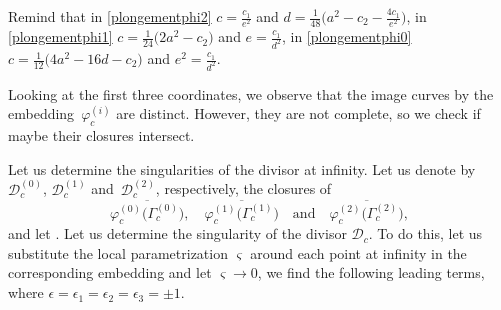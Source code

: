 \documentclass[pdftex]{sigma}
\numberwithin{equation}{section}
\begin{document}
Remind that in \eqref{plongementphi2} $c=\frac{c_1}{e^2}$ and $d=
\frac{1}{48} \bigl(a^2-c_2-\frac{4c_1}{e^2} \bigr)$, in
\eqref{plongementphi1} $c=\frac{1}{24} \bigl(2a^2-c_2 \bigr)$ and
$e=\frac{c_1}{d^2}$, in \eqref{plongementphi0}
$c=\frac{1}{12} \bigl(4a^2-16d-c_2\big )$ and
$e^2=\frac{c_1}{d^2}$.

Looking at the first three coordinates, we observe that the image
curves by the embedding~$\varphi_c^{ (i )}$ are distinct.
However, they are not complete, so we check if maybe their
closures intersect.

Let us determine the singularities of the divisor at infinity. Let
us denote by $\mathcal{D}_c^{ (0 )}$, $\mathcal{D}_c^{ (1 )}$ and~$\mathcal{D}_c^{(2)}$, respectively, the closures of
\[
\overline{\varphi_c^{ (0 )} \bigl(\Gamma_c^{ (0 )} \bigr)},  \quad \overline{\varphi_c^{ (1 )} \bigl(\Gamma_c^{ (1 )} \bigr)} \quad \text{and} \quad \overline{\varphi_c^{(2)} \bigl(\Gamma_c^{(2)} \bigr)},
 \]
and let . Let us determine the singularity of
the divisor $\mathcal{D}_c$. To do this, let us substitute the local
parametrization $\varsigma$ around each point at infinity in the
corresponding  embedding and let
$\varsigma \rightarrow 0$, we find the following leading terms,
where $\epsilon=\epsilon_1=\epsilon_2=\epsilon_3=\pm 1$.
\end{document}
